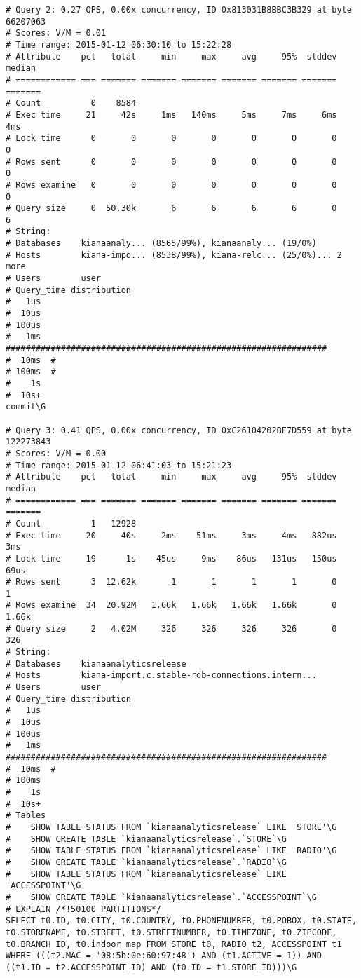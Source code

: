 \begin{appendix}
\begin{footnotesize}
\begin{verbatim}
# Query 2: 0.27 QPS, 0.00x concurrency, ID 0x813031B8BBC3B329 at byte 66207063
# Scores: V/M = 0.01
# Time range: 2015-01-12 06:30:10 to 15:22:28
# Attribute    pct   total     min     max     avg     95%  stddev  median
# ============ === ======= ======= ======= ======= ======= ======= =======
# Count          0    8584
# Exec time     21     42s     1ms   140ms     5ms     7ms     6ms     4ms
# Lock time      0       0       0       0       0       0       0       0
# Rows sent      0       0       0       0       0       0       0       0
# Rows examine   0       0       0       0       0       0       0       0
# Query size     0  50.30k       6       6       6       6       0       6
# String:
# Databases    kianaanaly... (8565/99%), kianaanaly... (19/0%)
# Hosts        kiana-impo... (8538/99%), kiana-relc... (25/0%)... 2 more
# Users        user
# Query_time distribution
#   1us
#  10us
# 100us
#   1ms  ################################################################
#  10ms  #
# 100ms  #
#    1s
#  10s+
commit\G

# Query 3: 0.41 QPS, 0.00x concurrency, ID 0xC26104202BE7D559 at byte 122273843
# Scores: V/M = 0.00
# Time range: 2015-01-12 06:41:03 to 15:21:23
# Attribute    pct   total     min     max     avg     95%  stddev  median
# ============ === ======= ======= ======= ======= ======= ======= =======
# Count          1   12928
# Exec time     20     40s     2ms    51ms     3ms     4ms   882us     3ms
# Lock time     19      1s    45us     9ms    86us   131us   150us    69us
# Rows sent      3  12.62k       1       1       1       1       0       1
# Rows examine  34  20.92M   1.66k   1.66k   1.66k   1.66k       0   1.66k
# Query size     2   4.02M     326     326     326     326       0     326
# String:
# Databases    kianaanalyticsrelease
# Hosts        kiana-import.c.stable-rdb-connections.intern...
# Users        user
# Query_time distribution
#   1us
#  10us
# 100us
#   1ms  ################################################################
#  10ms  #
# 100ms
#    1s
#  10s+
# Tables
#    SHOW TABLE STATUS FROM `kianaanalyticsrelease` LIKE 'STORE'\G
#    SHOW CREATE TABLE `kianaanalyticsrelease`.`STORE`\G
#    SHOW TABLE STATUS FROM `kianaanalyticsrelease` LIKE 'RADIO'\G
#    SHOW CREATE TABLE `kianaanalyticsrelease`.`RADIO`\G
#    SHOW TABLE STATUS FROM `kianaanalyticsrelease` LIKE 'ACCESSPOINT'\G
#    SHOW CREATE TABLE `kianaanalyticsrelease`.`ACCESSPOINT`\G
# EXPLAIN /*!50100 PARTITIONS*/
SELECT t0.ID, t0.CITY, t0.COUNTRY, t0.PHONENUMBER, t0.POBOX, t0.STATE, t0.STORENAME, t0.STREET, t0.STREETNUMBER, t0.TIMEZONE, t0.ZIPCODE, t0.BRANCH_ID, t0.indoor_map FROM STORE t0, RADIO t2, ACCESSPOINT t1 WHERE (((t2.MAC = '08:5b:0e:60:97:48') AND (t1.ACTIVE = 1)) AND ((t1.ID = t2.ACCESSPOINT_ID) AND (t0.ID = t1.STORE_ID)))\G


\end{verbatim}
\end{footnotesize}
\end{appendix}

